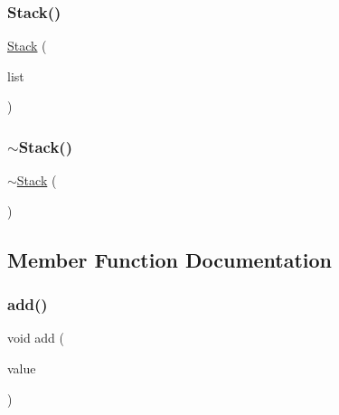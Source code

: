 \mbox{\label{classStack_aecafaaaa5e02b2c138a10f6482963634}} 
\subsubsection{\texorpdfstring{Stack()}{Stack()}\hspace{0.1cm}{\footnotesize\ttfamily [2/2]}}
{\footnotesize\ttfamily \mbox{\hyperlink{classStack}{Stack}} (\begin{DoxyParamCaption}\item[{std\+::initializer\+\_\+list$<$ Value\+Type $>$}]{list }\end{DoxyParamCaption})}

\mbox{\label{classStack_ade4f41695c7ea04c2aec4babf349f280}} 
\subsubsection{\texorpdfstring{$\sim$\+Stack()}{~Stack()}}
{\footnotesize\ttfamily $\sim$\mbox{\hyperlink{classStack}{Stack}} (\begin{DoxyParamCaption}{ }\end{DoxyParamCaption})\hspace{0.3cm}{\ttfamily [virtual]}}



\subsection{Member Function Documentation}
\mbox{\label{classStack_ab901606bf3a8019c986f0cf9a9f298dc}} 
\subsubsection{\texorpdfstring{add()}{add()}}
{\footnotesize\ttfamily void add (\begin{DoxyParamCaption}\item[{const Value\+Type \&}]{value }\end{DoxyParamCaption})}

\mbox{\label{classStack_ad69bd11391be1a1dba5c8202259664f8}} 
